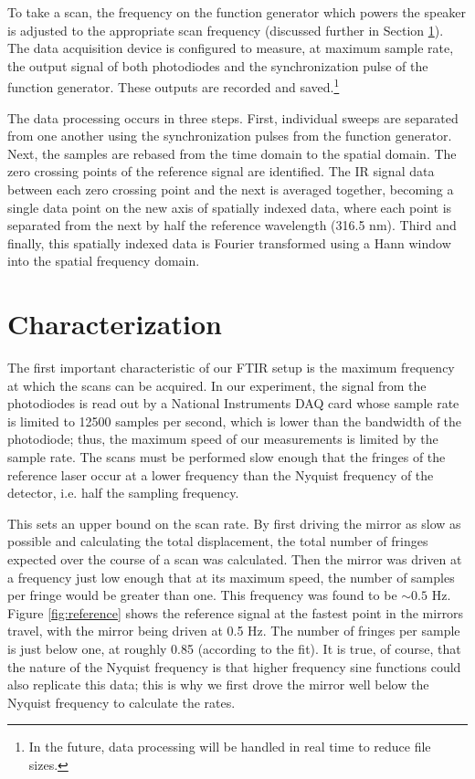 \documentclass[12pt]{report}
\begin{document}
To take a scan, the frequency on the function generator which powers the speaker is adjusted to the appropriate scan frequency (discussed further in Section \ref{sec:characterization}). The data acquisition device is configured to measure, at maximum sample rate, the output signal of both photodiodes and the synchronization pulse of the function generator. These outputs are recorded and saved.\footnote{In the future, data processing will be handled in real time to reduce file sizes.}

The data processing occurs in three steps. First, individual sweeps are separated from one another using the synchronization pulses from the function generator. Next, the samples are rebased from the time domain to the spatial domain. The zero crossing points of the reference signal are identified. The IR signal data between each zero crossing point and the next is averaged together, becoming a single data point on the new axis of spatially indexed data, where each point is separated from the next by half the reference wavelength (316.5 nm). Third and finally, this spatially indexed data is Fourier transformed using a Hann window into the spatial frequency domain. 

\section{Characterization}
\label{sec:characterization}

The first important characteristic of our FTIR setup is the maximum frequency at which the scans can be acquired. In our experiment, the signal from the photodiodes is read out by a National Instruments DAQ card whose sample rate is limited to 12500 samples per second, which is lower than the bandwidth of the photodiode; thus, the maximum speed of our measurements is limited by the sample rate. The scans must be performed slow enough that the fringes of the reference laser occur at a lower frequency than the Nyquist frequency of the detector, i.e. half the sampling frequency.

This sets an upper bound on the scan rate. By first driving the mirror as slow as possible and calculating the total displacement, the total number of fringes expected over the course of a scan was calculated. Then the mirror was driven at a frequency just low enough that at its maximum speed, the number of samples per fringe would be greater than one. This frequency was found to be $\sim 0.5$ Hz. Figure \ref{fig:reference} shows the reference signal at the fastest point in the mirrors travel, with the mirror being driven at 0.5 Hz. The number of fringes per sample is just below one, at roughly 0.85 (according to the fit). It is true, of course, that the nature of the Nyquist frequency is that higher frequency sine functions could also replicate this data; this is why we first drove the mirror well below the Nyquist frequency to calculate the rates.
\end{document}
